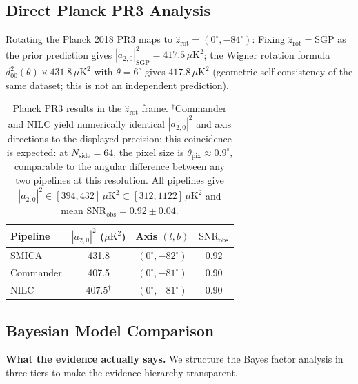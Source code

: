 \documentclass[12pt]{article}
\begin{document}
\subsection{Direct Planck PR3 Analysis}

Rotating the Planck 2018 PR3 maps to $\hat{z}_\mathrm{rot} = (0^\circ, -84^\circ)$:
Fixing $\hat{z}_\mathrm{rot} = \mathrm{SGP}$ as the prior prediction gives
$|a_{2,0}|^2_\mathrm{SGP} = 417.5\,\mu\mathrm{K}^2$; the Wigner rotation formula
$d^2_{00}(\theta)\times431.8\,\mu\mathrm{K}^2$ with $\theta = 6^\circ$ gives
$417.8\,\mu\mathrm{K}^2$ (geometric self-consistency of the same dataset; this is
not an independent prediction).

\begin{table}[h]
\centering
\caption{Planck PR3 results in the $\hat{z}_\mathrm{rot}$ frame.
$^\dagger$Commander and NILC yield numerically identical $|a_{2,0}|^2$ and axis
directions to the displayed precision; this coincidence is expected: at
$N_\mathrm{side}=64$, the pixel size is $\theta_\mathrm{pix}\approx0.9^\circ$,
comparable to the angular difference between any two pipelines at this resolution.
All pipelines give $|a_{2,0}|^2 \in [394,432]\,\mu\mathrm{K}^2 \subset
[312,1122]\,\mu\mathrm{K}^2$ and mean $\mathrm{SNR}_\mathrm{obs}=0.92\pm0.04$.}
\begin{tabular}{lccc}
\toprule
Pipeline & $|a_{2,0}|^2$ ($\mu\mathrm{K}^2$) & Axis $(l,b)$ & $\mathrm{SNR}_\mathrm{obs}$ \\
\midrule
SMICA     & 431.8 & $(0^\circ,-82^\circ)$ & 0.92 \\
Commander & 407.5 & $(0^\circ,-81^\circ)$ & 0.90 \\
NILC      & $407.5^\dagger$ & $(0^\circ,-81^\circ)$ & 0.90 \\
\bottomrule
\end{tabular}
\end{table}

\subsection{Bayesian Model Comparison}

\textbf{What the evidence actually says.}
We structure the Bayes factor analysis in three tiers to make the evidence
hierarchy transparent.
\end{document}
